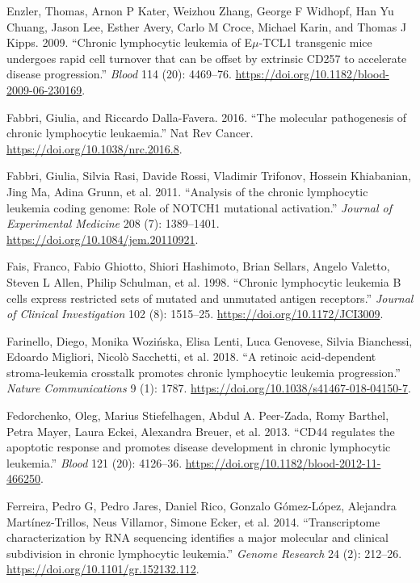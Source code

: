 \documentclass[11pt, a4paper, twosided]{book}
\newenvironment{CSLReferences}%
  {}%
  {\par}
\begin{document}
\begin{CSLReferences}{1}{0}
\leavevmode{}%
Enzler, Thomas, Arnon P Kater, Weizhou Zhang, George F Widhopf, Han Yu Chuang, Jason Lee, Esther Avery, Carlo M Croce, Michael Karin, and Thomas J Kipps. 2009. {``{Chronic lymphocytic leukemia of E\(\mu\)-TCL1 transgenic mice undergoes rapid cell turnover that can be offset by extrinsic CD257 to accelerate disease progression}.''} \emph{Blood} 114 (20): 4469--76. \url{https://doi.org/10.1182/blood-2009-06-230169}.

\leavevmode{}%
Fabbri, Giulia, and Riccardo Dalla-Favera. 2016. {``{The molecular pathogenesis of chronic lymphocytic leukaemia}.''} Nat Rev Cancer. \url{https://doi.org/10.1038/nrc.2016.8}.

\leavevmode{}%
Fabbri, Giulia, Silvia Rasi, Davide Rossi, Vladimir Trifonov, Hossein Khiabanian, Jing Ma, Adina Grunn, et al. 2011. {``{Analysis of the chronic lymphocytic leukemia coding genome: Role of NOTCH1 mutational activation}.''} \emph{Journal of Experimental Medicine} 208 (7): 1389--1401. \url{https://doi.org/10.1084/jem.20110921}.

\leavevmode{}%
Fais, Franco, Fabio Ghiotto, Shiori Hashimoto, Brian Sellars, Angelo Valetto, Steven L Allen, Philip Schulman, et al. 1998. {``{Chronic lymphocytic leukemia B cells express restricted sets of mutated and unmutated antigen receptors}.''} \emph{Journal of Clinical Investigation} 102 (8): 1515--25. \url{https://doi.org/10.1172/JCI3009}.

\leavevmode{}%
Farinello, Diego, Monika Wozińska, Elisa Lenti, Luca Genovese, Silvia Bianchessi, Edoardo Migliori, Nicolò Sacchetti, et al. 2018. {``{A retinoic acid-dependent stroma-leukemia crosstalk promotes chronic lymphocytic leukemia progression}.''} \emph{Nature Communications} 9 (1): 1787. \url{https://doi.org/10.1038/s41467-018-04150-7}.

\leavevmode{}%
Fedorchenko, Oleg, Marius Stiefelhagen, Abdul A. Peer-Zada, Romy Barthel, Petra Mayer, Laura Eckei, Alexandra Breuer, et al. 2013. {``{CD44 regulates the apoptotic response and promotes disease development in chronic lymphocytic leukemia}.''} \emph{Blood} 121 (20): 4126--36. \url{https://doi.org/10.1182/blood-2012-11-466250}.

\leavevmode{}%
Ferreira, Pedro G, Pedro Jares, Daniel Rico, Gonzalo Gómez-López, Alejandra Martínez-Trillos, Neus Villamor, Simone Ecker, et al. 2014. {``{Transcriptome characterization by RNA sequencing identifies a major molecular and clinical subdivision in chronic lymphocytic leukemia}.''} \emph{Genome Research} 24 (2): 212--26. \url{https://doi.org/10.1101/gr.152132.112}.


\end{CSLReferences}
\end{document}
